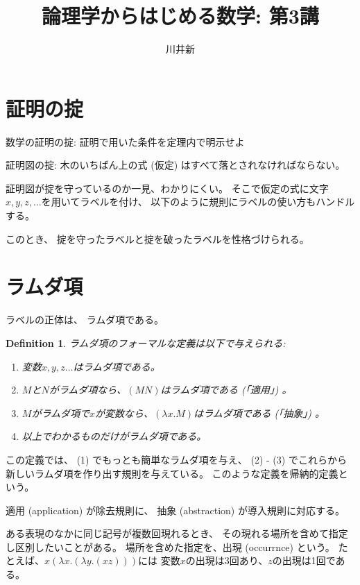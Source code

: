 \documentclass[fleqn]{jsarticle}
\title{論理学からはじめる数学: 第3講}
\author{川井新}
\newtheorem{defi}{Definition}
\begin{document}
\maketitle

\section{証明の掟}

数学の証明の掟: 証明で用いた条件を定理内で明示せよ

証明図の掟: 木のいちばん上の式 (仮定) はすべて落とされなければならない。


証明図が掟を守っているのか一見、わかりにくい。
そこで仮定の式に文字$x, y, z, \ldots$を用いてラベルを付け、
以下のように規則にラベルの使い方もハンドルする。



このとき、
掟を守ったラベルと掟を破ったラベルを性格づけられる。


\section{ラムダ項} 

ラベルの正体は、
ラムダ項である。


\begin{defi}
ラムダ項のフォーマルな定義は以下で与えられる:
  \begin{enumerate}
    \item 変数$x, y, z \ldots$はラムダ項である。
    \item $M$と$N$がラムダ項なら、$(MN)$はラムダ項である (「適用」) 。
    \item $M$がラムダ項で$x$が変数なら、$(\lambda x. M)$はラムダ項である (「抽象」) 。
    \item 以上でわかるものだけがラムダ項である。
  \end{enumerate}
\end{defi}

この定義では、 (1) でもっとも簡単なラムダ項を与え、
(2) - (3) でこれらから新しいラムダ項を作り出す規則を与えている。
このような定義を帰納的定義という。

適用 (application) が除去規則に、
抽象 (abstraction) が導入規則に対応する。

ある表現のなかに同じ記号が複数回現れるとき、
その現れる場所を含めて指定し区別したいことがある。
場所を含めた指定を、出現 (occurrnce) という。
たとえば、$x (\lambda x .(\lambda y. (xz)))$には
変数$x$の出現は3回あり、$z$の出現は1回である。
\end{document}
